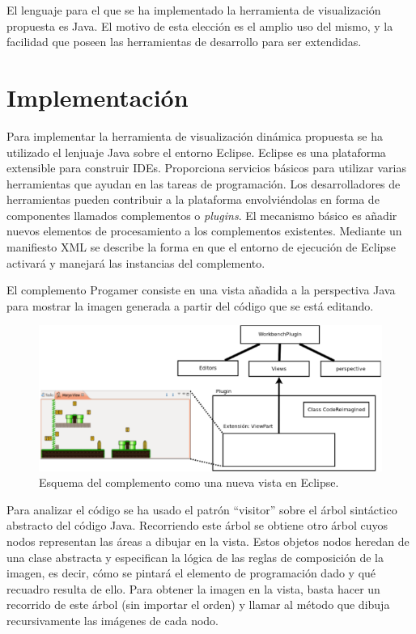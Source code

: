 \documentclass{llncs}
\begin{document}
El lenguaje para el que se ha implementado la herramienta de visualización propuesta es Java. El motivo de esta elección es el amplio uso del mismo, y la facilidad que poseen las herramientas de desarrollo para ser extendidas.



\section{Implementación}
\label{sec:details}
Para implementar la herramienta de visualización dinámica propuesta se ha utilizado el lenjuaje Java sobre el entorno Eclipse. Eclipse es una plataforma extensible para construir IDEs. Proporciona servicios básicos para utilizar varias herramientas que ayudan en las tareas de programación. Los desarrolladores de herramientas pueden contribuir a la plataforma envolviéndolas en forma de componentes llamados complementos o \emph{plugins}. El mecanismo básico es añadir nuevos elementos de procesamiento a los complementos existentes. Mediante un manifiesto XML se describe la forma en que el entorno de ejecución de Eclipse activará y manejará las instancias del complemento. 

El complemento Progamer consiste en una vista añadida a la perspectiva Java para mostrar la imagen generada a partir del código que se está editando. 

\begin{figure}[ht]
\begin{center}
\includegraphics[scale=0.35]{images/crplugin.eps}
\caption{Esquema del complemento como una nueva vista en Eclipse.
\label{fig:crplugin}}
\end{center}
\end{figure}

Para analizar el código se ha usado el patrón ``visitor'' sobre el árbol sintáctico abstracto del código Java. Recorriendo este árbol se obtiene otro árbol cuyos nodos representan las áreas a dibujar en la vista. Estos objetos nodos heredan de una clase abstracta y especifican la lógica de las reglas de composición de la imagen, es decir, cómo se pintará el elemento de programación dado y qué recuadro resulta de ello. Para obtener la imagen en la vista, basta hacer un recorrido de este árbol (sin importar el orden) y llamar al método que dibuja recursivamente las imágenes de cada nodo. 
\end{document}
